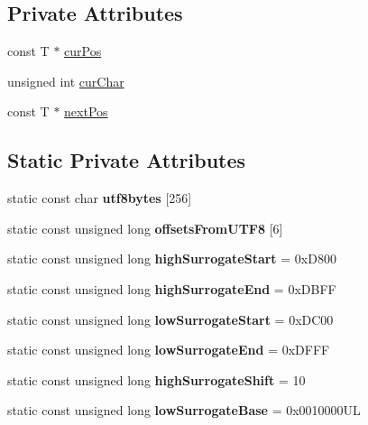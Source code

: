 \subsection*{Private Attributes}
\begin{DoxyCompactItemize}
\item 
const T $\ast$ \hyperlink{class_f_t_unicode_string_itr_a95fd553f6a2620484dbc20fd21d0ae4f}{cur\+Pos}
\item 
unsigned int \hyperlink{class_f_t_unicode_string_itr_af44cf52a933cb0b6b144f05687c521b2}{cur\+Char}
\item 
const T $\ast$ \hyperlink{class_f_t_unicode_string_itr_a1de6b890c630933db1e550b5a44a2458}{next\+Pos}
\end{DoxyCompactItemize}
\subsection*{Static Private Attributes}
\begin{DoxyCompactItemize}
\item 
static const char {\bfseries utf8bytes} \mbox{[}256\mbox{]}
\item 
static const unsigned long {\bfseries offsets\+From\+U\+T\+F8} \mbox{[}6\mbox{]}
\item 
static const unsigned long {\bfseries high\+Surrogate\+Start} = 0x\+D800\hypertarget{class_f_t_unicode_string_itr_a80d22c3b3b2e9e9da682584c3bccc387}{}\label{class_f_t_unicode_string_itr_a80d22c3b3b2e9e9da682584c3bccc387}

\item 
static const unsigned long {\bfseries high\+Surrogate\+End} = 0x\+D\+B\+FF\hypertarget{class_f_t_unicode_string_itr_a2a2ddba598f93b5c034f3d0b6ece6e30}{}\label{class_f_t_unicode_string_itr_a2a2ddba598f93b5c034f3d0b6ece6e30}

\item 
static const unsigned long {\bfseries low\+Surrogate\+Start} = 0x\+D\+C00\hypertarget{class_f_t_unicode_string_itr_abeb665aaf677ef135f53b5ba19ca28fa}{}\label{class_f_t_unicode_string_itr_abeb665aaf677ef135f53b5ba19ca28fa}

\item 
static const unsigned long {\bfseries low\+Surrogate\+End} = 0x\+D\+F\+FF\hypertarget{class_f_t_unicode_string_itr_a02744f537c7cda9991531c4679f7f3e6}{}\label{class_f_t_unicode_string_itr_a02744f537c7cda9991531c4679f7f3e6}

\item 
static const unsigned long {\bfseries high\+Surrogate\+Shift} = 10\hypertarget{class_f_t_unicode_string_itr_a4315f39d0945f10c9bc05f1d0f069c6b}{}\label{class_f_t_unicode_string_itr_a4315f39d0945f10c9bc05f1d0f069c6b}

\item 
static const unsigned long {\bfseries low\+Surrogate\+Base} = 0x0010000\+UL\hypertarget{class_f_t_unicode_string_itr_ad023928f4a11c4c3eb145f4c18421118}{}\label{class_f_t_unicode_string_itr_ad023928f4a11c4c3eb145f4c18421118}

\end{DoxyCompactItemize}


